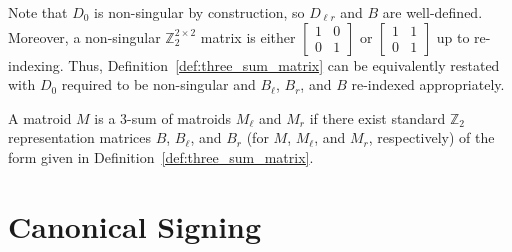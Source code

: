 \begin{definition}
    Note that $D_{0}$ is non-singular by construction, so $D_{\ell r}$ and $B$ are well-defined. Moreover, a non-singular $\mathbb{Z}_{2}^{2 \times 2}$ matrix is either  $\begin{bmatrix} 1 & 0 \\ 0 & 1 \end{bmatrix}$ or $\begin{bmatrix} 1 & 1 \\ 0 & 1 \end{bmatrix}$ up to re-indexing. Thus, Definition~\ref{def:three_sum_matrix} can be equivalently restated with $D_{0}$ required to be non-singular and $B_{\ell}$, $B_{r}$, and $B$ re-indexed appropriately.
\end{definition}

\begin{definition}\label{def:three_sum_matroid}
    A matroid $M$ is a $3$-sum of matroids $M_{\ell}$ and $M_{r}$ if there exist standard $\mathbb{Z}_{2}$ representation matrices $B$, $B_{\ell}$, and $B_{r}$ (for $M$, $M_{\ell}$, and $M_{r}$, respectively) of the form given in Definition~\ref{def:three_sum_matrix}.
\end{definition}


\section{Canonical Signing}

